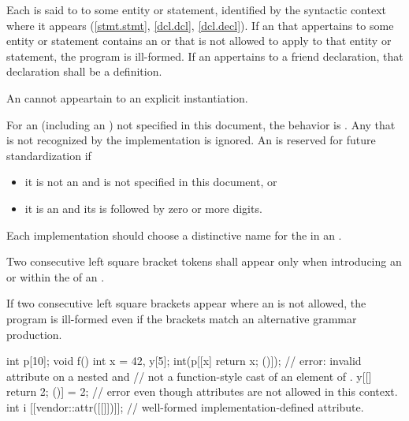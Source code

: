 \pnum
Each  is said to  to some entity or
statement, identified by the syntactic context where it appears
(\ref{stmt.stmt}, \ref{dcl.dcl},
\ref{dcl.decl}). If an  that appertains to some
entity or statement contains an  or  that
is not allowed to apply to that
entity or statement, the program is ill-formed. If an 
appertains to a friend declaration, that declaration shall be a
definition.
\begin{note}
An  cannot appeartain to
an explicit instantiation.
\end{note}

\pnum
For an 
(including an )
not specified in this document, the
behavior is .
Any  that is not recognized by the implementation
is ignored.
An  is reserved for future standardization if
\begin{itemize}
\item it is not an  and
is not specified in this document, or
\item it is an  and
its  is
 followed by zero or more digits.
\end{itemize}
Each implementation should choose a distinctive name for the
 in an .

\pnum
Two consecutive left square bracket tokens shall appear only
when introducing an  or
within the  of
an .
\begin{note}
If two consecutive left square brackets appear
where an  is not allowed, the program is ill-formed even
if the brackets match an alternative grammar production.
\end{note}
\begin{example}
\begin{codeblock}
int p[10];
void f() {
  int x = 42, y[5];
  int(p[[x] { return x; }()]);  // error: invalid attribute on a nested  and
                                // not a function-style cast of an element of .
  y[[] { return 2; }()] = 2;    // error even though attributes are not allowed in this context.
  int i [[vendor::attr([[]])]]; // well-formed implementation-defined attribute.
}
\end{codeblock}
\end{example}

